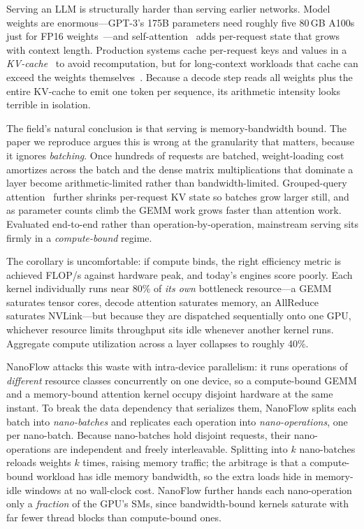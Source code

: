 \documentclass[manuscript,review]{acmart}
\newcommand{\nf}{NanoFlow\xspace}   %
\begin{document}
Serving an LLM is structurally harder than serving earlier networks. Model weights are 
enormous---GPT-3's 175B parameters need roughly five 80\,GB A100s just for FP16 
weights~\cite{brown2020language}---and self-attention~\cite{vaswani2017attention} adds per-request state 
that grows with context length. Production systems cache per-request keys and values in a 
\emph{KV-cache}~\cite{pope2023efficiently} to avoid recomputation, but for long-context workloads that 
cache can exceed the weights themselves~\cite{tang2024quest}. Because a decode step reads all weights plus 
the entire KV-cache to emit one token per sequence, its arithmetic intensity looks terrible in isolation.

The field's natural conclusion is that serving is memory-bandwidth bound. The paper we reproduce argues this 
is wrong at the granularity that matters, because it ignores \emph{batching}. Once hundreds of requests are 
batched, weight-loading cost amortizes across the batch and the dense matrix multiplications that dominate a 
layer become arithmetic-limited rather than bandwidth-limited. Grouped-query attention~\cite{ainslie2023gqa} 
further shrinks per-request KV state so batches grow larger still, and as parameter counts climb the GEMM work 
grows faster than attention work. Evaluated end-to-end rather than operation-by-operation, mainstream serving 
sits firmly in a \emph{compute-bound} regime.

The corollary is uncomfortable: if compute binds, the right efficiency metric is achieved FLOP/s against 
hardware peak, and today's engines score poorly. Each kernel individually runs near 80\% of \emph{its own} 
bottleneck resource---a GEMM saturates tensor cores, decode attention saturates memory, an AllReduce saturates 
NVLink---but because they are dispatched sequentially onto one GPU, whichever resource limits throughput sits 
idle whenever another kernel runs. Aggregate compute utilization across a layer collapses to roughly 40\%.

\nf attacks this waste with intra-device parallelism: it runs operations of \emph{different} resource classes 
concurrently on one device, so a compute-bound GEMM and a memory-bound attention kernel occupy disjoint hardware 
at the same instant. To break the data dependency that serializes them, \nf splits each batch into 
\emph{nano-batches} and replicates each operation into \emph{nano-operations}, one per nano-batch. Because 
nano-batches hold disjoint requests, their nano-operations are independent and freely interleavable. Splitting 
into $k$ nano-batches reloads weights $k$ times, raising memory traffic; the arbitrage is that a compute-bound 
workload has idle memory bandwidth, so the extra loads hide in memory-idle windows at no wall-clock cost. \nf 
further hands each nano-operation only a \emph{fraction} of the GPU's SMs, since bandwidth-bound kernels 
saturate with far fewer thread blocks than compute-bound ones.
\end{document}
